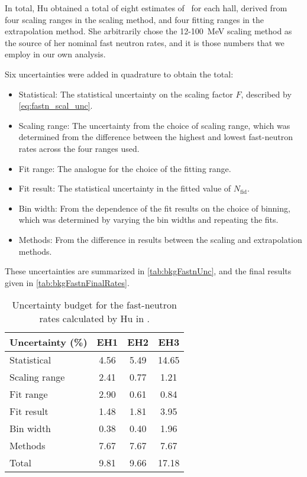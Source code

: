 \documentclass[../thesis.tex]{subfiles}
\begin{document}
In total, Hu obtained a total of eight estimates of \rfn\ for each hall, derived from four scaling ranges in the scaling method, and four fitting ranges in the extrapolation method. She arbitrarily chose the 12-100~MeV scaling method as the source of her nominal fast neutron rates, and it is those numbers that we employ in our own analysis.

Six uncertainties were added in quadrature to obtain the total:
\begin{itemize}
\item Statistical: The statistical uncertainty on the scaling factor $F$, described by \eqref{eq:fastn_scal_unc}.
\item Scaling range: The uncertainty from the choice of scaling range, which was determined from the difference between the highest and lowest fast-neutron rates across the four ranges used.
\item Fit range: The analogue for the choice of the fitting range.
\item Fit result: The statistical uncertainty in the fitted value of $N_\mathrm{fid}$.
\item Bin width: From the dependence of the fit results on the choice of binning, which was determined by varying the bin widths and repeating the fits.
\item Methods: From the difference in results between the scaling and extrapolation methods.
\end{itemize}
These uncertainties are summarized in \autoref{tab:bkgFastnUnc}, and the final results given in \autoref{tab:bkgFastnFinalRates}.

\begin{table}[ht]
  \begin{tabular}{lccc}
    \toprule
    Uncertainty (\%)            & EH1  & EH2  & EH3 \\
    \midrule
    Statistical & 4.56 & 5.49 & 14.65 \\
    Scaling range & 2.41 & 0.77 & 1.21 \\
    Fit range & 2.90 & 0.61 & 0.84 \\
    Fit result & 1.48 & 1.81 & 3.95 \\
    Bin width & 0.38 & 0.40 & 1.96 \\
    Methods & 7.67 & 7.67 & 7.67 \\
    \midrule
    Total & 9.81 & 9.66 & 17.18 \\
    \bottomrule
  \end{tabular}
  \caption{Uncertainty budget for the fast-neutron rates calculated by Hu in \cite{fastn}.}
  \label{tab:bkgFastnUnc}
\end{table}
\end{document}
